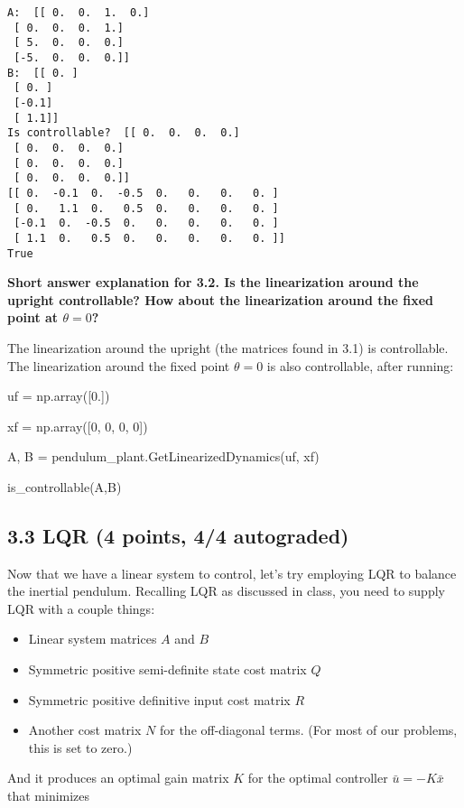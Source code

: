 \documentclass[11pt]{article}
\providecommand{\tightlist}{%
      \setlength{\itemsep}{0pt}\setlength{\parskip}{0pt}}
\begin{document}
    \begin{Verbatim}[commandchars=\\\{\}]
A:  [[ 0.  0.  1.  0.]
 [ 0.  0.  0.  1.]
 [ 5.  0.  0.  0.]
 [-5.  0.  0.  0.]]
B:  [[ 0. ]
 [ 0. ]
 [-0.1]
 [ 1.1]]
Is controllable?  [[ 0.  0.  0.  0.]
 [ 0.  0.  0.  0.]
 [ 0.  0.  0.  0.]
 [ 0.  0.  0.  0.]]
[[ 0.  -0.1  0.  -0.5  0.   0.   0.   0. ]
 [ 0.   1.1  0.   0.5  0.   0.   0.   0. ]
 [-0.1  0.  -0.5  0.   0.   0.   0.   0. ]
 [ 1.1  0.   0.5  0.   0.   0.   0.   0. ]]
True

    \end{Verbatim}

    \textbf{Short answer explanation for 3.2. Is the linearization around
the upright controllable? How about the linearization around the fixed
point at \(\theta = 0\)?}

The linearization around the upright (the matrices found in 3.1) is
controllable. The linearization around the fixed point \(\theta = 0\) is
also controllable, after running:

uf = np.array({[}0.{]})

xf = np.array({[}0, 0, 0, 0{]})

A, B = pendulum\_plant.GetLinearizedDynamics(uf, xf)

is\_controllable(A,B)

    \subsection{3.3 LQR (4 points, 4/4
autograded)}\label{lqr-4-points-44-autograded}

Now that we have a linear system to control, let's try employing LQR to
balance the inertial pendulum. Recalling LQR as discussed in class, you
need to supply LQR with a couple things:

\begin{itemize}
\tightlist
\item
  Linear system matrices \(A\) and \(B\)
\item
  Symmetric positive semi-definite state cost matrix \(Q\)
\item
  Symmetric positive definitive input cost matrix \(R\)
\item
  Another cost matrix \(N\) for the off-diagonal terms. (For most of our
  problems, this is set to zero.)
\end{itemize}

And it produces an optimal gain matrix \(K\) for the optimal controller
\(\bar{u} = - K\bar{x}\) that minimizes
\end{document}
